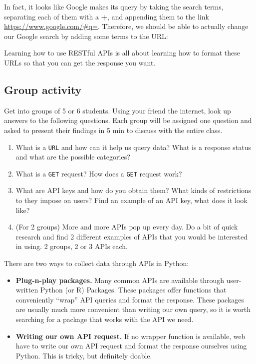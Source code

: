 \documentclass[
  letterpaper,
  DIV=11,
  numbers=noendperiod]{scrreprt}
\providecommand{\tightlist}{%
  \setlength{\itemsep}{0pt}\setlength{\parskip}{0pt}}\usepackage{longtable,booktabs,array}
\begin{document}
In fact, it looks like Google makes its query by taking the search
terms, separating each of them with a \textbf{+}, and appending them to
the link \url{https://www.google.com/\#q=}. Therefore, we should be able
to actually change our Google search by adding some terms to the URL:

Learning how to use RESTful APIs is all about learning how to format
these URLs so that you can get the response you want.

\subsection{Group activity}\label{group-activity}

Get into groups of 5 or 6 students. Using your friend the internet, look
up answers to the following questions. Each group will be assigned one
question and asked to present their findings in 5 min to discuss with
the entire class.

\begin{enumerate}
\def\labelenumi{\arabic{enumi}.}
\tightlist
\item
  What is a \texttt{URL} and how can it help us query data? What is a
  response status and what are the possible categories?
\item
  What is a \texttt{GET} request? How does a \texttt{GET} request work?
\item
  What are API keys and how do you obtain them? What kinds of
  restrictions to they impose on users? Find an example of an API key,
  what does it look like?
\item
  (For 2 groups) More and more APIs pop up every day. Do a bit of quick
  research and find 2 different examples of APIs that you would be
  interested in using. 2 groups, 2 or 3 APIs each.
\end{enumerate}

There are two ways to collect data through APIs in Python:

\begin{itemize}
\tightlist
\item
  \textbf{Plug-n-play packages.} Many common APIs are available through
  user-written Python (or R) Packages. These packages offer functions
  that conveniently ``wrap'' API queries and format the response. These
  packages are usually much more convenient than writing our own query,
  so it is worth searching for a package that works with the API we
  need.
\item
  \textbf{Writing our own API request.} If no wrapper function is
  available, web have to write our own API request and format the
  response ourselves using Python. This is tricky, but definitely
  doable.
\end{itemize}
\end{document}
